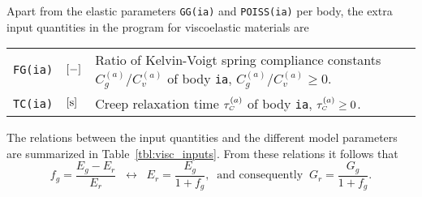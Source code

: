\documentclass[12pt]{report}
\newenvironment{inputvars}{\vspace{0.4\baselineskip}%

\begin{tabular}{>{\raggedright}p{22mm}p{19mm}p{113mm}}}{
\end{tabular}

}
\newcommand{\inpvar}[3]{{\small\tt #1} & $#2$ & #3 \\[1ex]}
\begin{document}
Apart from the elastic parameters {\tt GG(ia)} and {\tt POISS(ia)} per body,
the extra input quantities in the program for viscoelastic materials are
\begin{inputvars}
\inpvar{FG(ia)}{\bunit{-}}{Ratio of Kelvin-Voigt spring compliance constants
        $C_g^{(a)}/C_v^{(a)}$ of body {\tt ia}, $C_g^{(a)}/C_v^{(a)} \geq 0$.}
\inpvar{TC(ia)}{\bunit{s}}{Creep relaxation time $\tau_{\scriptscriptstyle C}^{(a)}$ of body {\tt ia},
        $\tau_{\scriptscriptstyle C}^{(a)}\geq 0$.}
\end{inputvars}

The relations between the input quantities and the different model parameters
are summarized in Table~\ref{tbl:visc_inputs}. From these relations it
follows that
\begin{equation}
        f_g = \frac{E_g - E_r}{E_r} \;\;\leftrightarrow\;\;
        E_r = \frac{E_g}{1+f_g}, \;\;\mbox{and consequently}\;\;
        G_r = \frac{G_g}{1+f_g} .
\end{equation}
\end{document}
